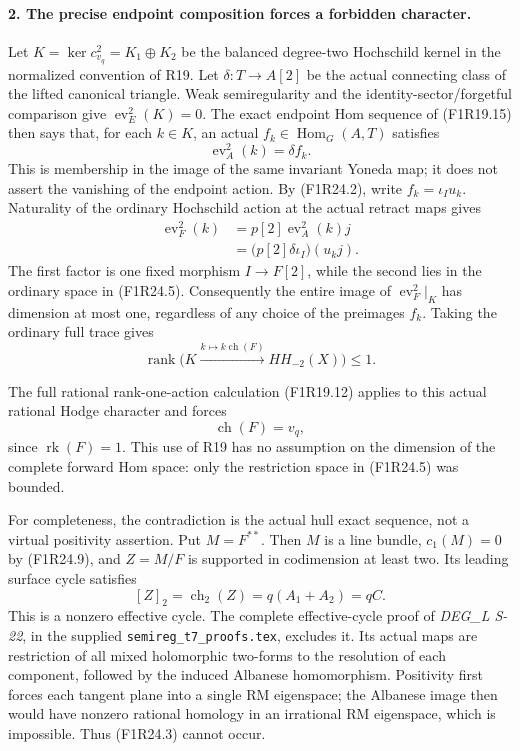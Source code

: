 \paragraph{2. The precise endpoint composition forces a forbidden character.}
Let $K=\ker c^2_{v_q}=K_1\oplus K_2$ be the balanced
degree-two Hochschild kernel in the normalized convention of
R19. Let $\delta:T\to A[2]$ be the actual connecting class
of the lifted canonical triangle. Weak semiregularity and the
identity-sector/forgetful comparison give
$\operatorname{ev}_E^2(K)=0$. The exact endpoint Hom sequence
of (F1R19.15) then says that, for each $k\in K$, an actual
$f_k\in\operatorname{Hom}_G(A,T)$ satisfies
\[
                \operatorname{ev}_A^2(k)=\delta f_k.
 \tag{F1R24.6}
\]
This is membership in the image of the same invariant Yoneda
map; it does not assert the vanishing of the endpoint action.
By (F1R24.2), write $f_k=\iota_Iu_k$. Naturality of the
ordinary Hochschild action at the actual retract maps gives
\[
 \begin{split}
 \operatorname{ev}_F^2(k)
   &=p[2]\operatorname{ev}_A^2(k)j\\
   &=\bigl(p[2]\delta\iota_I\bigr)(u_kj).
 \end{split}
 \tag{F1R24.7}
\]
The first factor is one fixed morphism $I\to F[2]$, while
the second lies in the ordinary space in (F1R24.5).
Consequently the entire image of $\operatorname{ev}_F^2|_K$
has dimension at most one, regardless of any choice of the
preimages $f_k$. Taking the ordinary full trace gives
\[
     \operatorname{rank}\bigl(K\xrightarrow{k\mapsto
              k\operatorname{ch}(F)}HH_{-2}(X)\bigr)\le1.
 \tag{F1R24.8}
\]

The full rational rank-one-action calculation (F1R19.12)
applies to this actual rational Hodge character and forces
\[
                       \operatorname{ch}(F)=v_q,
 \tag{F1R24.9}
\]
since $\operatorname{rk}(F)=1$. This use of R19 has no
assumption on the dimension of the complete forward Hom
space: only the restriction space in (F1R24.5) was bounded.

For completeness, the contradiction is the actual hull exact
sequence, not a virtual positivity assertion. Put $M=F^{**}$.
Then $M$ is a line bundle, $c_1(M)=0$ by (F1R24.9), and
$Z=M/F$ is supported in codimension at least two. Its leading
surface cycle satisfies
\[
          [Z]_2=\operatorname{ch}_2(Z)=q(A_1+A_2)=qC.
 \tag{F1R24.10}
\]
This is a nonzero effective cycle. The complete effective-cycle
proof of \emph{DEG\_L S-22}, in the supplied
\texttt{semireg\_t7\_proofs.tex}, excludes it. Its actual maps
are restriction of all mixed holomorphic two-forms to the
resolution of each component, followed by the induced
Albanese homomorphism. Positivity first forces each tangent
plane into a single RM eigenspace; the Albanese image then
would have nonzero rational homology in an irrational RM
eigenspace, which is impossible. Thus (F1R24.3) cannot occur.

